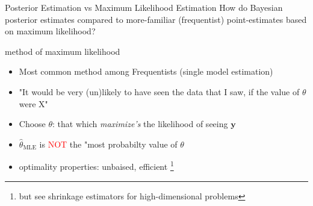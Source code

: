 \documentclass[presentation,9pt,xcolor=dvipsnames]{beamer}
\begin{document}
\begin{frame}[label={sec:org1a797d7}]{Posterior Estimation vs Maximum Likelihood Estimation}
How do Bayesian posterior estimates compared to more-familiar (frequentist) point-estimates based on maximum likelihood?
\begin{block}{method of maximum likelihood}
\begin{itemize}
\item Most common method among Frequentists (single model estimation)
\item "It would be very (un)likely to have seen the data that I saw, if the value of \(\theta\) were X"
\item Choose \(\theta\): that which \emph{maximize's} the likelihood of seeing \(\mathbf{y}\)
\item \(\hat{\theta}_\text{MLE}\) is \textcolor{red}{NOT} the "most probabilty value of \(\theta\)
\item optimality properties: unbaised, efficient \footnote{but see shrinkage estimators for high-dimensional problems}
\end{itemize}
\end{block}
\end{frame}
\end{document}
